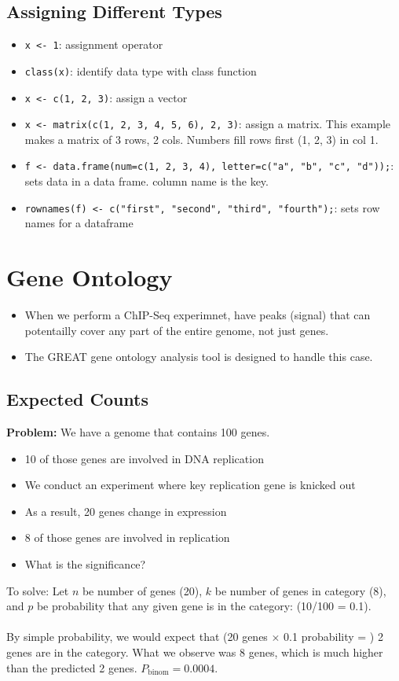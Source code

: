 \documentclass[10pt]{article}
\begin{document}
\subsection*{Assigning Different Types}
\begin{itemize}
	\item \texttt{x <- 1}: assignment operator
	\item \texttt{class(x)}: identify data type with class function
	\item \texttt{x <- c(1, 2, 3)}: assign a vector
	\item \texttt{x <- matrix(c(1, 2, 3, 4, 5, 6), 2, 3)}: assign a matrix.  This example makes a matrix of 3 rows, 2 cols.  Numbers fill rows first (1, 2, 3) in col 1.
	\item \texttt{f <- data.frame(num=c(1, 2, 3, 4), letter=c("a", "b", "c", "d"));}: sets data in a data frame.  column name is the key.
	\item \texttt{rownames(f) <- c("first", "second", "third", "fourth");}: sets row names for a dataframe
\end{itemize}

\section*{Gene Ontology}
\begin{itemize}
	\item When we perform a ChIP-Seq experimnet, have peaks (signal) that can potentailly cover any part of the entire genome, not just genes.
	\item The GREAT gene ontology analysis tool is designed to handle this case.
\end{itemize}

\subsection*{Expected Counts}
\textbf{Problem:}  We have a genome that contains 100 genes.
\begin{itemize}
	\item 10 of those genes are involved in DNA replication
	\item We conduct an experiment where key replication gene is knicked out
	\item As a result, 20 genes change in expression
	\item 8 of those genes are involved in replication
	\item What is the significance?
\end{itemize}
To solve:  Let $n$ be number of genes (20), $k$ be number of genes in category (8), and $p$ be probability that any given gene is in the category:  (10/100 = 0.1).\\\\
By simple probability, we would expect that (20 genes $\times$ 0.1 probability = ) 2 genes are in the category.  What we observe was 8 genes, which is much higher than the predicted 2 genes.  $P_{\text{binom}} = 0.0004$.
\end{document}
